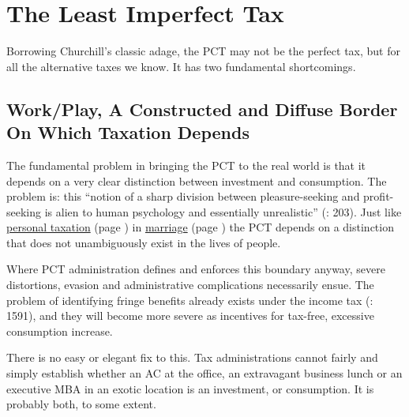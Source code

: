 \section{The Least Imperfect Tax} \label{sec:LeastImperfect} Borrowing Churchill's classic adage, the PCT may not be the perfect tax, but for all the alternative taxes we know. It has two fundamental shortcomings.

\subsection[Work/Play]{Work/Play, A Constructed and Diffuse Border On Which Taxation Depends} \label{sec:WorkPlay} The fundamental problem in bringing the PCT to the real world is that it depends on a very clear distinction between investment and consumption. The problem is: this ``notion of a sharp division between pleasure-seeking and profit-seeking is alien to human psychology and essentially unrealistic'' (\citealt{Bittker1973}: 203). Just like \hyperref[des:PersonalTaxation]{personal taxation} (page \pageref{des:PersonalTaxation}) in \hyperref[sec:LoveMarriage]{marriage} (page \pageref{sec:LoveMarriage}) the PCT depends on a distinction that does not unambiguously exist in the lives of people.


Where PCT administration defines and enforces this boundary anyway, severe distortions, evasion and administrative complications necessarily ensue. The problem of identifying fringe benefits already exists under the income tax (\citealt{Graetz2009}: 1591), and they will become more severe as incentives for tax-free, excessive consumption increase. 

There is no easy or elegant fix to this. Tax administrations cannot fairly and simply establish whether an AC at the office, an extravagant business lunch or an executive MBA in an exotic location is an investment, or consumption. It is probably both, to some extent. 

